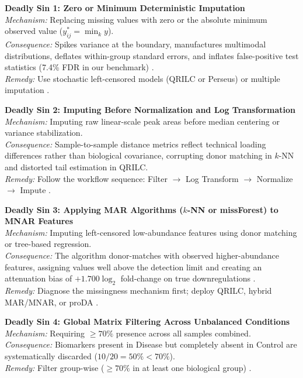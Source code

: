 \documentclass[11pt,oneside]{book}
\begin{document}
\begin{pitfallbox}
\textbf{Deadly Sin 1: Zero or Minimum Deterministic Imputation}\\
\textit{Mechanism:} Replacing missing values with zero or the absolute minimum observed value ($y_{ij}^* = \min_k y$).\\
\textit{Consequence:} Spikes variance at the boundary, manufactures multimodal distributions, deflates within-group standard errors, and inflates false-positive test statistics (7.4\% FDR in our benchmark) \cite{lazar2016accounting}.\\
\textit{Remedy:} Use stochastic left-censored models (QRILC or Perseus) or multiple imputation \cite{tyanova2016perseus, rubin1987multiple}.
\end{pitfallbox}

\begin{pitfallbox}
\textbf{Deadly Sin 2: Imputing Before Normalization and Log Transformation}\\
\textit{Mechanism:} Imputing raw linear-scale peak areas before median centering or variance stabilization.\\
\textit{Consequence:} Sample-to-sample distance metrics reflect technical loading differences rather than biological covariance, corrupting donor matching in $k$-NN and distorted tail estimation in QRILC.\\
\textit{Remedy:} Follow the workflow sequence: Filter $\to$ Log Transform $\to$ Normalize $\to$ Impute \cite{julian2024rprogramming, valikangas2018systematic}.
\end{pitfallbox}

\begin{pitfallbox}
\textbf{Deadly Sin 3: Applying MAR Algorithms ($k$-NN or missForest) to MNAR Features}\\
\textit{Mechanism:} Imputing left-censored low-abundance features using donor matching or tree-based regression.\\
\textit{Consequence:} The algorithm donor-matches with observed higher-abundance features, assigning values well above the detection limit and creating an attenuation bias of $+1.700 \log_2$ fold-change on true downregulations \cite{palstrom2020imputation, lazar2016accounting}.\\
\textit{Remedy:} Diagnose the missingness mechanism first; deploy QRILC, hybrid MAR/MNAR, or proDA \cite{ahlmann2020proda, palstrom2020imputation}.
\end{pitfallbox}

\begin{pitfallbox}
\textbf{Deadly Sin 4: Global Matrix Filtering Across Unbalanced Conditions}\\
\textit{Mechanism:} Requiring $\ge 70\%$ presence across all samples combined.\\
\textit{Consequence:} Biomarkers present in Disease but completely absent in Control are systematically discarded ($10/20 = 50\% < 70\%$).\\
\textit{Remedy:} Filter group-wise ($\ge 70\%$ in at least one biological group) \cite{zhang2018dep, webb2020review}.
\end{pitfallbox}
\end{document}
